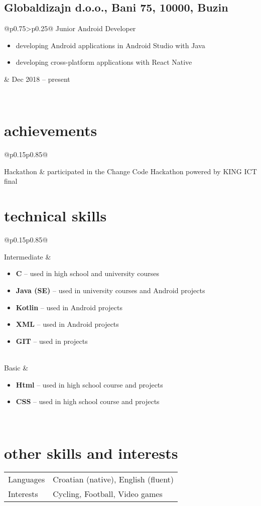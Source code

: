 \documentclass[a4paper]{article}
\makeatletter
\newlength{\tablewidth}
\newenvironment{period}[2]{%
\newcommand{\sarma}{#2}%
\setlength{\tablewidth}{\linewidth}
\addtolength{\tablewidth}{-2\tabcolsep}
\begin{tabular}{@{}p{0.75\tablewidth}>{\raggedleft\arraybackslash}p{0.25\tablewidth}@{}}%
#1 \newline
\begin{itemize}
}{%
\end{itemize} & \sarma \\%
\end{tabular}\\
}
\newenvironment{skills}{%
\setlength{\tablewidth}{\linewidth}
\addtolength{\tablewidth}{-2\tabcolsep}
\begin{tabular}{@{}p{0.15\tablewidth}p{0.85\tablewidth}@{}}
}{%
\end{tabular}
}
\makeatother
\begin{document}
\subsection{Globaldizajn d.o.o., Bani 75, 10000, Buzin }
\begin{period}{Junior Android Developer}{Dec 2018 -- present}
    \item developing Android applications in Android Studio with Java
    \item developing cross-platform applications with React Native
\end{period}

\section{achievements}
\begin{skills}
    Hackathon   &   participated in the Change Code Hackathon powered by KING ICT final 
\end{skills}

\section{technical skills}
\begin{skills}
    Intermediate &
    \begin{itemize}
    	\item \textbf{C} -- used in high school and university courses
        \item \textbf{Java (SE)} -- used in university courses and Android projects
        \item \textbf{Kotlin} -- used in Android projects
        \item \textbf{XML} -- used in Android projects
         \item \textbf{GIT} -- used in projects
    \end{itemize} \\
    Basic &
    \begin{itemize}
        \item \textbf{Html} -- used in high school course and projects
        \item \textbf{CSS} -- used in high school course and projects
    \end{itemize} \\
\end{skills}

\section{other skills and interests}
\begin{skills}
    Languages & Croatian (native), English (fluent)\\
    Interests & Cycling, Football, Video games \\
\end{skills}
\end{document}
